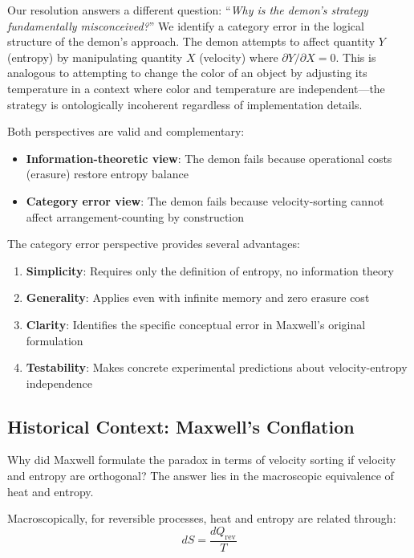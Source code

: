 \documentclass[10pt,twocolumn,letterpaper]{article}
\theoremstyle{definition}
\theoremstyle{remark}
\begin{document}
Our resolution answers a different question: ``\textit{Why is the demon's strategy fundamentally misconceived?}'' We identify a category error in the logical structure of the demon's approach. The demon attempts to affect quantity $Y$ (entropy) by manipulating quantity $X$ (velocity) where $\partial Y/\partial X = 0$. This is analogous to attempting to change the color of an object by adjusting its temperature in a context where color and temperature are independent—the strategy is ontologically incoherent regardless of implementation details.

Both perspectives are valid and complementary:
\begin{itemize}
\item \textbf{Information-theoretic view}: The demon fails because operational costs (erasure) restore entropy balance
\item \textbf{Category error view}: The demon fails because velocity-sorting cannot affect arrangement-counting by construction
\end{itemize}

The category error perspective provides several advantages:
\begin{enumerate}
\item \textbf{Simplicity}: Requires only the definition of entropy, no information theory
\item \textbf{Generality}: Applies even with infinite memory and zero erasure cost
\item \textbf{Clarity}: Identifies the specific conceptual error in Maxwell's original formulation
\item \textbf{Testability}: Makes concrete experimental predictions about velocity-entropy independence
\end{enumerate}

\subsection{Historical Context: Maxwell's Conflation}

Why did Maxwell formulate the paradox in terms of velocity sorting if velocity and entropy are orthogonal? The answer lies in the macroscopic equivalence of heat and entropy.

Macroscopically, for reversible processes, heat and entropy are related through:
\begin{equation}
dS = \frac{dQ_{\text{rev}}}{T}
\label{eq:heat_entropy_macro}
\end{equation}
\end{document}
